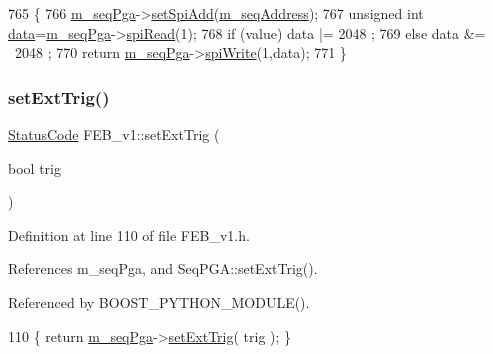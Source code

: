 \begin{DoxyCode}
765                                                  \{
766   \hyperlink{classFEB__v1_a6c7804ac86796f233a8393043adf2e77}{m\_seqPga}->\hyperlink{classSeqPGA_ac998ce3a6d9b5f2e88cc8393f8c1df53}{setSpiAdd}(\hyperlink{classFEB__v1_a1c1eb093fd1733b9510fcf8bc5c7ad08}{m\_seqAddress});
767   \textcolor{keywordtype}{unsigned} \textcolor{keywordtype}{int} \hyperlink{classFEB__v1_a6bca4320bd3bbbc32efc81097f33421a}{data}=\hyperlink{classFEB__v1_a6c7804ac86796f233a8393043adf2e77}{m\_seqPga}->\hyperlink{classSeqPGA_ab3d0e5e5d4014bc7a92588a76b8713d4}{spiRead}(1);
768   \textcolor{keywordflow}{if} (value) data |=  2048 ;
769   \textcolor{keywordflow}{else}       data &= ~2048 ;
770   \textcolor{keywordflow}{return} \hyperlink{classFEB__v1_a6c7804ac86796f233a8393043adf2e77}{m\_seqPga}->\hyperlink{classSeqPGA_ad4421841ce4ce8b88ad13f63216f0743}{spiWrite}(1,data);
771 \}
\end{DoxyCode}
\mbox{\label{classFEB__v1_aea3b1f84ea9be2e5c55a93ae215c8a35}} 
\subsubsection{\texorpdfstring{set\+Ext\+Trig()}{setExtTrig()}}
{\footnotesize\ttfamily \hyperlink{classStatusCode}{Status\+Code} F\+E\+B\+\_\+v1\+::set\+Ext\+Trig (\begin{DoxyParamCaption}\item[{bool}]{trig }\end{DoxyParamCaption})\hspace{0.3cm}{\ttfamily [inline]}}



Definition at line 110 of file F\+E\+B\+\_\+v1.\+h.



References m\+\_\+seq\+Pga, and Seq\+P\+G\+A\+::set\+Ext\+Trig().



Referenced by B\+O\+O\+S\+T\+\_\+\+P\+Y\+T\+H\+O\+N\+\_\+\+M\+O\+D\+U\+L\+E().


\begin{DoxyCode}
110 \{ \textcolor{keywordflow}{return} \hyperlink{classFEB__v1_a6c7804ac86796f233a8393043adf2e77}{m\_seqPga}->\hyperlink{classSeqPGA_a9744b6cff04738474556cc2153af19de}{setExtTrig}( trig ); \}
\end{DoxyCode}
\mbox{\label{classFEB__v1_ac30cac86837c86e4f03cb51fff6226cd}} 
